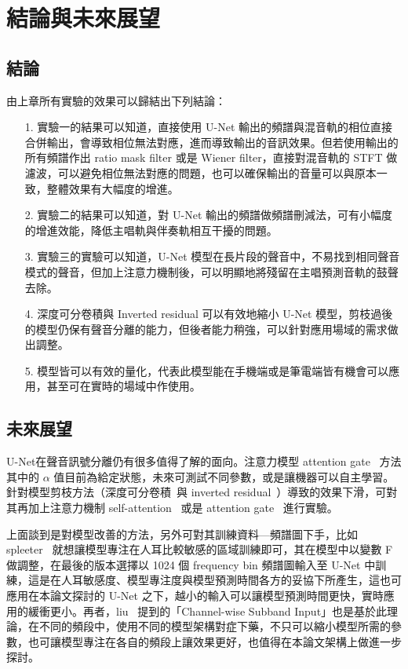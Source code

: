 \chapter{結論與未來展望}


\section{結論}

由上章所有實驗的效果可以歸結出下列結論：
\begin{itemize}
    \item[1.] 實驗一的結果可以知道，直接使用 U-Net 輸出的頻譜與混音軌的相位直接合併輸出，會導致相位無法對應，進而導致輸出的音訊效果。但若使用輸出的所有頻譜作出 ratio mask filter 或是 Wiener filter，直接對混音軌的 STFT 做濾波，可以避免相位無法對應的問題，也可以確保輸出的音量可以與原本一致，整體效果有大幅度的增進。
    \item[2.] 實驗二的結果可以知道，對 U-Net 輸出的頻譜做頻譜刪減法，可有小幅度的增進效能，降低主唱軌與伴奏軌相互干擾的問題。
    \item[3.] 實驗三的實驗可以知道，U-Net 模型在長片段的聲音中，不易找到相同聲音模式的聲音，但加上注意力機制後，可以明顯地將殘留在主唱預測音軌的鼓聲去除。
    \item[4.] 深度可分卷積與 Inverted residual 可以有效地縮小 U-Net 模型，剪枝過後的模型仍保有聲音分離的能力，但後者能力稍強，可以針對應用場域的需求做出調整。
    \item[5.] 模型皆可以有效的量化，代表此模型能在手機端或是筆電端皆有機會可以應用，甚至可在實時的場域中作使用。
\end{itemize}


\section{未來展望}

U-Net在聲音訊號分離仍有很多值得了解的面向。注意力模型 attention gate~\cite{oktay2018attention} 方法其中的 $\alpha$ 值目前為給定狀態，未來可測試不同參數，或是讓機器可以自主學習。針對模型剪枝方法（深度可分卷積~\cite{chollet2017xception,howard2017mobilenets}與 inverted residual~\cite{sandler2018mobilenetv2}）導致的效果下滑，可對其再加上注意力機制 self-attention~\cite{shaw2018self} 或是 attention gate~\cite{oktay2018attention} 進行實驗。

上面談到是對模型改善的方法，另外可對其訓練資料—頻譜圖下手，比如 spleeter~\cite{hennequin2020spleeter} 就想讓模型專注在人耳比較敏感的區域訓練即可，其在模型中以變數 F 做調整，在最後的版本選擇以 1024 個 frequency bin 頻譜圖輸入至 U-Net 中訓練，這是在人耳敏感度、模型專注度與模型預測時間各方的妥協下所產生，這也可應用在本論文探討的 U-Net 之下，越小的輸入可以讓模型預測時間更快，實時應用的緩衝更小。再者，liu~\cite{liu2020channel} 提到的「Channel-wise Subband Input」也是基於此理論，在不同的頻段中，使用不同的模型架構對症下藥，不只可以縮小模型所需的參數，也可讓模型專注在各自的頻段上讓效果更好，也值得在本論文架構上做進一步探討。

